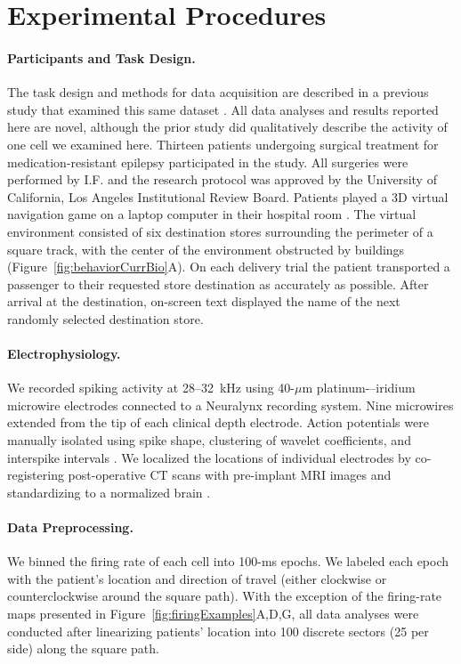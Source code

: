 \section{Experimental Procedures}

\paragraph{Participants and Task Design.} The task design and methods for data acquisition are described in a previous study that examined this same dataset \citep{JacoEtal10}. All data analyses and results reported here are novel, although the prior study \citep{JacoEtal10} did qualitatively describe the activity of one cell we examined here. Thirteen patients undergoing surgical treatment for medication-resistant epilepsy participated in the study.  All surgeries were performed by I.F. and the research protocol was approved by the University of California, Los Angeles Institutional Review Board.  Patients played a 3D virtual navigation game on a laptop computer in their hospital room \citep{EkstEtal03,JacoEtal10,JacoKaha10,JacoEtal13}. The virtual environment consisted of six destination stores surrounding the perimeter of a square track, with the center of the environment obstructed by buildings (Figure~\ref{fig:behaviorCurrBio}A). On each delivery trial the patient transported a passenger to their requested store destination as accurately as possible.  After arrival at the destination, on-screen text displayed the name of the next randomly selected destination store.

\paragraph{Electrophysiology.}  We recorded spiking activity at 28--32~kHz using 40-$\mu$m platinum-–iridium microwire electrodes \citep{FrieEtal99} connected to a Neuralynx recording system. Nine microwires extended from the tip of each clinical depth electrode. Action potentials were manually isolated using spike shape, clustering of wavelet coefficients, and interspike intervals \citep{QuirEtal04}.  We localized the locations of individual electrodes by co-registering post-operative CT scans with pre-implant MRI images and standardizing to a normalized brain \cite{TalaTour88}.

\paragraph{Data Preprocessing.} We binned the firing rate of each cell into 100-ms epochs. We labeled each epoch with the patient's location and direction of travel (either clockwise or counterclockwise around the square path). With the exception of the firing-rate maps presented in Figure~\ref{fig:firingExamples}A,D,G, all data analyses were conducted after linearizing patients' location into 100 discrete sectors (25 per side) along the square path.

